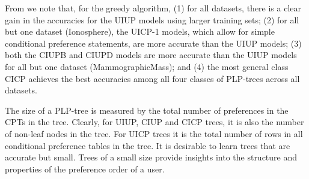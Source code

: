 From  we note that, for the greedy algorithm,
(1) for all datasets, there is a clear gain in the accuracies for 
the UIUP models using larger training sets;
(2) for all but one dataset (Ionosphere), the UICP-1 models, which allow for 
simple conditional preference statements, are more accurate than the UIUP 
models;
(3) both the CIUPB and CIUPD models are more accurate than the UIUP 
models for all but one dataset (MammographicMass); and
(4) the most general class CICP achieves the best accuracies among
all four classes of PLP-trees across all datasets.

The size of a PLP-tree is measured by the total number of preferences
in the CPTs in the tree.  Clearly, for UIUP, CIUP and CICP trees, it is
also the number of non-leaf nodes in the tree. For UICP trees it is the total
number of rows in all conditional preference tables in the tree. It is 
desirable to learn trees that are accurate but small. Trees of a small size 
provide insights into the structure and properties of the preference
order of a user.

